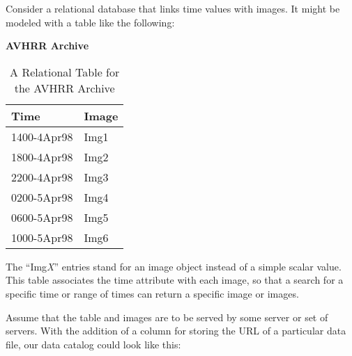 \documentclass[10pt]{report}
\begin{document}
Consider a relational database that links time values with images.  It
might be modeled with a table like the following:

\begin{table}[h] 
\begin{center}
\textbf{AVHRR Archive} \\
\begin{tabular}{|l|l|} \hline
Time        &Image \\ \hline
1400-4Apr98 &Img1 \\
1800-4Apr98 &Img2 \\
2200-4Apr98 &Img3 \\
0200-5Apr98 &Img4 \\
0600-5Apr98 &Img5 \\
1000-5Apr98 &Img6 \\ \hline
\end{tabular}
\end{center}
\caption{A Relational Table for the AVHRR Archive}
\label{fig:reltbl}
\end{table}

\noindent
The ``Img\emph{X}'' entries stand for an image object instead of a
simple scalar value.  This table associates the time attribute with
each image, so that a search for a specific time or range of times can
return a specific image or images.

Assume that the table and images are to be served by some server or
set of servers.  With the addition of a column for storing the URL of
a particular data file, our data catalog could look like this:
\end{document}
